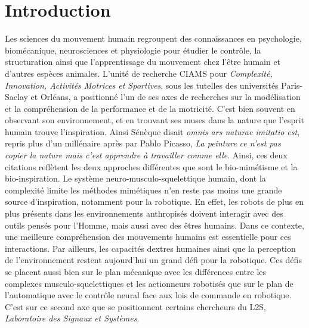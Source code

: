 \documentclass[12pt, a4paper]{article} %
\numberwithin{equation}{section}
\begin{document}
\tableofcontents

\newpage
\setcounter{page}{1}
\pagestyle{fancy}

\section*{Introduction}  \label{sec_intro}

Les sciences du mouvement humain regroupent des connaissances en psychologie, biomécanique, neurosciences et physiologie pour étudier le contrôle, la structuration ainsi que l'apprentissage du mouvement chez l'être humain et d'autres espèces animales. L'unité de recherche CIAMS pour \textit{Complexité, Innovation, Activités Motrices et Sportives}, sous les tutelles des universités Paris-Saclay et Orléans, a positionné l'un de ses axes de recherches sur la modélisation et la compréhension de la performance et de la motricité. 
%
\newlineBlank
%
C'est bien souvent en observant son environnement, et en trouvant ses muses dans la nature que l'esprit humain trouve l'inspiration. Ainsi Sénèque disait \textit{omnis ars naturae imitatio est}, repris plus d'un millénaire après par Pablo Picasso, \textit{La peinture ce n'est pas copier la nature mais c'est apprendre à travailler comme elle}. Ainsi, ces deux citations reflètent les deux approches différentes que sont le bio-mimétisme et la bio-inspiration. Le système neuro-musculo-squelettique humain, dont la complexité limite les méthodes mimétiques n'en reste pas moins une grande source d'inspiration, notamment pour la robotique.
%
\newlineBlank
%
En effet, les robots de plus en plus présents dans les environnements anthropisés doivent interagir avec des outils pensés pour l'Homme, mais aussi avec des êtres humains. Dans ce contexte, une meilleure compréhension des mouvements humains est essentielle pour ces interactions. Par ailleurs, les capacités dextres humaines ainsi que la perception de l'environnement restent aujourd'hui un grand défi pour la robotique. Ces défis se placent aussi bien sur le plan mécanique avec les différences entre les complexes musculo-squelettiques et les actionneurs robotisés que sur le plan de l'automatique avec le contrôle neural face aux lois de commande en robotique. C'est sur ce second axe que se positionnent certains chercheurs du L2S, \textit{Laboratoire des Signaux et Systèmes}.
%
\newlineBlank
%
\end{document}
